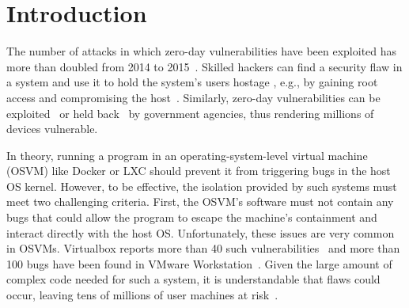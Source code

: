 \section{Introduction}
\label{sec.introduction}

%
The number of attacks in which zero-day vulnerabilities have been exploited has more than
doubled from 2014 to 2015~\cite{zero-day}. Skilled hackers can find a security
flaw in a system and use it to hold the system's users hostage , e.g., by
gaining root access and compromising the host~\cite{linux-0day}. Similarly, zero-day
vulnerabilities can be exploited~\cite{fbi-0day} or held back~\cite{nsa-0day} by government
agencies, thus rendering millions of devices vulnerable.
%

In theory, running a program in an operating-system-level virtual machine (OSVM) like Docker or LXC should
prevent it from triggering bugs in the host OS kernel.  However, to be
effective, the isolation provided by such systems must meet two challenging criteria. First, the OSVM's
software must not contain any bugs that could allow the program to escape the
machine's containment and interact directly with the host OS.
Unfortunately, these issues are very common in OSVMs. Virtualbox reports more than 40 such
vulnerabilities~\cite{Virtualbox-Vulnerabilities} and more than 100 bugs have
been found in VMware Workstation~\cite{VMWare-Vulnerabilities}. 
Given the large amount of complex code needed for such a system, it is understandable that flaws could occur,
leaving tens of millions of user machines at risk~\cite{linux-0day}.

